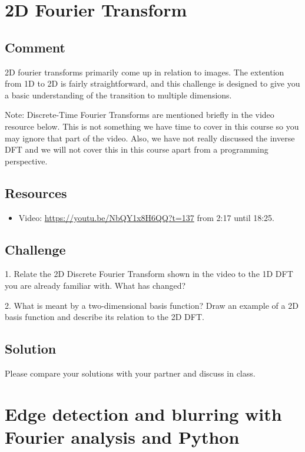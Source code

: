 \newpage
\section{2D Fourier Transform}

\subsection*{Comment}
2D fourier transforms primarily come up in relation to images. The extention from 1D to 2D is fairly straightforward, and this challenge is designed to give you a basic understanding of the transition to multiple dimensions.

Note: Discrete-Time Fourier Transforms are mentioned briefly in the video resource below. This is not something we have time to cover in this course so you may ignore that part of the video. Also, we have not really discussed the inverse DFT and we will not cover this in this course apart from a programming perspective.

\subsection*{Resources}
\begin{itemize}
    \item Video: \url{https://youtu.be/NbQY1x8H6QQ?t=137} from 2:17 until 18:25.
\end{itemize}

\subsection*{Challenge}
1. Relate the 2D Discrete Fourier Transform shown in the video to the 1D DFT you are already familiar with. What has changed?

2. What is meant by a two-dimensional basis function? Draw an example of a 2D basis function and describe its relation to the 2D DFT.

\subsection*{Solution}
Please compare your solutions with your partner and discuss in class.




\newpage
\section{Edge detection and blurring with Fourier analysis and Python}


